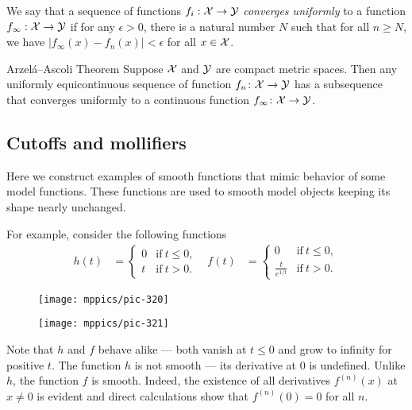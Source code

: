 We say that a sequence of functions $f_i : {\mathcal{X}} \to \mathcal{Y}$ \emph{converges uniformly} to a function $f_{\infty}: {\mathcal{X}} \to \mathcal{Y}$ if for any 
$\epsilon >0$, there is a natural number $N$ such that for all $n \ge N$, we have $|f_{\infty} (x)-f_n (x)|<\epsilon$
for all $x  \in {\mathcal{X}}$.

\begin{thm}{Arzel\'{a}--Ascoli Theorem}\label{lem:equicontinuous}
Suppose $\mathcal{X}$ and $\mathcal{Y}$ are compact metric spaces. 
Then any uniformly equicontinuous sequence of function $f_n\:\spc{X}\z\to \spc{Y}$ has a subsequence that converges uniformly to a continuous function $f_\infty\colon\mathcal{X}\to \mathcal{Y}$. 
\end{thm}

\subsection*{Cutoffs and mollifiers}

Here we construct examples of smooth functions that mimic behavior of some model functions.
These functions are used to smooth model objects keeping its shape nearly unchanged.

For example, consider the following functions
\begin{align*}
h(t)&=
\begin{cases}
0&\text{if}\ t\le 0,
\\
t&\text{if}\ t> 0.
\end{cases}
&
f(t)&=
\begin{cases}
0&\text{if}\ t\le 0,
\\
\frac{t}{e^{1\!/\!t}}&\text{if}\ t> 0.
\end{cases}
\end{align*}
\begin{figure}[h]
\begin{minipage}{.48\textwidth}
\centering
\texttt{[image: mppics/pic-320]}
\end{minipage}\hfill
\begin{minipage}{.48\textwidth}
\centering
\texttt{[image: mppics/pic-321]}
\end{minipage}
\end{figure}
Note that $h$ and $f$ behave alike ---
both vanish at $t\le 0$ and grow to infinity for positive $t$.
The function $h$ is not smooth --- its derivative at $0$ is undefined.
Unlike $h$, the function $f$ is smooth.
Indeed, the existence of all derivatives $f^{(n)}(x)$ at $x\ne 0$ is evident and direct calculations show that $f^{(n)}(0)=0$ for all $n$.

